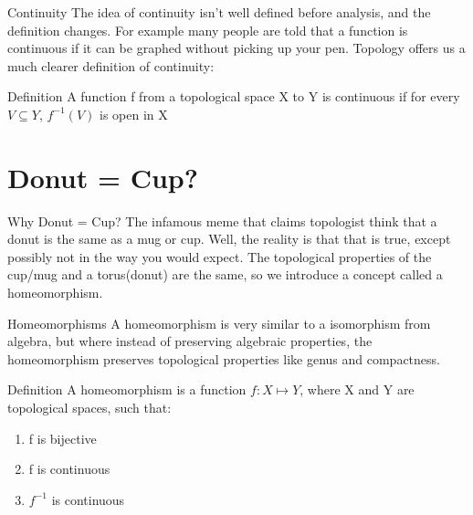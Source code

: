 \documentclass[aspectratio=169,xcolor=dvipsnames]{beamer}
\begin{document}
\begin{frame}{Continuity}
    The idea of continuity isn't well defined before analysis, and the definition changes. For example many people are told that a function is continuous if it can be graphed without picking up your pen. Topology offers us a much clearer definition of continuity: \newline
    \begin{block}{Definition}
        A function f from a topological space X to Y is continuous if for every $ V \subseteq Y$, $f^{-1}(V)$ is open in X
    \end{block}
\end{frame}
\section{Donut = Cup?}
\begin{frame}{Why Donut = Cup?}
    The infamous meme that claims topologist think that a donut is the same as a mug or cup. Well, the reality is that that is true, except possibly not in the way you would expect. The topological properties of the cup/mug and a torus(donut) are the same, so we introduce a concept called a homeomorphism.
\end{frame}
\begin{frame}{Homeomorphisms}
    A homeomorphism is very similar to a isomorphism from algebra, but where instead of preserving algebraic properties, the homeomorphism preserves topological properties like genus and compactness.\newline
    \begin{block}{Definition}
        A homeomorphism is a function $f:X \mapsto Y$, where X and Y are topological spaces, such that:
        \begin{enumerate}
            \item f is bijective 
            \item f is continuous
            \item $f^{-1}$ is continuous
        \end{enumerate}
    \end{block}
\end{frame}
\end{document}
